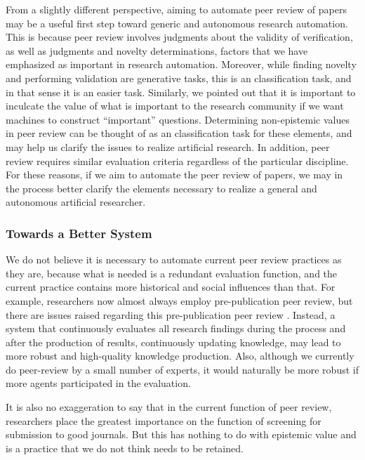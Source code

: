 From a slightly different perspective, aiming to automate peer review of papers may be a useful first step toward generic and autonomous research automation. This is because peer review involves judgments about the validity of verification, as well as judgments and novelty determinations, factors that we have emphasized as important in research automation. Moreover, while finding novelty and performing validation are generative tasks, this is an classification task, and in that sense it is an easier task. Similarly, we pointed out that it is important to inculcate the value of what is important to the research community if we want machines to construct ``important'' questions. Determining non-epistemic values in peer review can be thought of as an classification task for these elements, and may help us clarify the issues to realize artificial research. In addition, peer review requires similar evaluation criteria regardless of the particular discipline. For these reasons, if we aim to automate the peer review of papers, we may in the process better clarify the elements necessary to realize a general and autonomous artificial researcher.

\subsubsection{Towards a Better System}
We do not believe it is necessary to automate current peer review practices as they are, because what is needed is a redundant evaluation function, and the current practice contains more historical and social influences than that. For example, researchers now almost always employ pre-publication peer review, but there are issues raised regarding this pre-publication peer review \cite{heesen2021peer}. Instead, a system that continuously evaluates all research findings during the process and after the production of results, continuously updating knowledge, may lead to more robust and high-quality knowledge production. Also, although we currently do peer-review by a small number of experts, it would naturally be more robust if more agents participated in the evaluation.

It is also no exaggeration to say that in the current function of peer review, researchers place the greatest importance on the function of screening for submission to good journals. But this has nothing to do with epistemic value and is a practice that we do not think needs to be retained.

